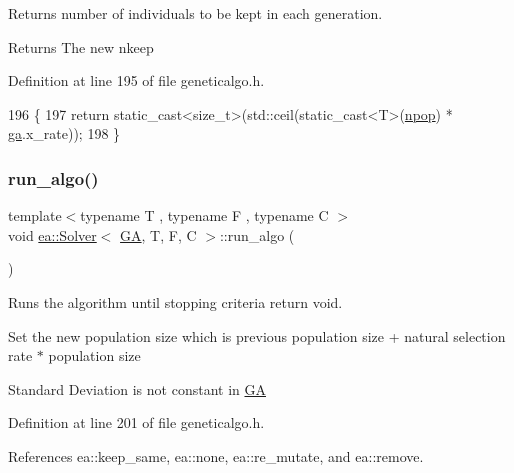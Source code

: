 Returns number of individuals to be kept in each generation. 

\begin{DoxyReturn}{Returns}
The new nkeep 
\end{DoxyReturn}


Definition at line 195 of file geneticalgo.\+h.


\begin{DoxyCode}
196     \{
197         \textcolor{keywordflow}{return} \textcolor{keyword}{static\_cast<}\textcolor{keywordtype}{size\_t}\textcolor{keyword}{>}(std::ceil(static\_cast<T>(\hyperlink{classea_1_1_solver_3_01_g_a_00_01_t_00_01_f_00_01_c_01_4_a805f49211363542de6984c7fd2c97c9c}{npop}) * \hyperlink{classea_1_1_solver_3_01_g_a_00_01_t_00_01_f_00_01_c_01_4_a5e56c4d15894af96c2be5fcaec7d14fb}{ga}.x\_rate));
198     \}
\end{DoxyCode}
\mbox{\label{classea_1_1_solver_3_01_g_a_00_01_t_00_01_f_00_01_c_01_4_aa03709c3636280a24879d01f9ad128ea}} 
\subsubsection{\texorpdfstring{run\+\_\+algo()}{run\_algo()}}
{\footnotesize\ttfamily template$<$typename T , typename F , typename C $>$ \\
void \hyperlink{classea_1_1_solver}{ea\+::\+Solver}$<$ \hyperlink{structea_1_1_g_a}{GA}, T, F, C $>$\+::run\+\_\+algo (\begin{DoxyParamCaption}{ }\end{DoxyParamCaption})\hspace{0.3cm}{\ttfamily [private]}}



Runs the algorithm until stopping criteria return void. 

Set the new population size which is previous population size + natural selection rate $\ast$ population size

Standard Deviation is not constant in \hyperlink{structea_1_1_g_a}{GA} 

Definition at line 201 of file geneticalgo.\+h.



References ea\+::keep\+\_\+same, ea\+::none, ea\+::re\+\_\+mutate, and ea\+::remove.


